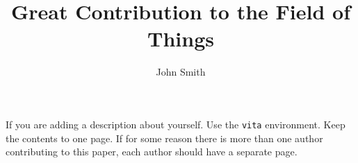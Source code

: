 \documentclass[]{../tex_resources/afitthesis}
\title{Great Contribution to the Field of Things}
\author{John Smith}
\begin{document}
\maketitle %







\appendix %




\nocite{*} %
\printbibliography %


\begin{vita} %
    If you are adding a description about yourself. Use the \verb|vita|
    environment. Keep the contents to one page. If for some reason there is
    more than one author contributing to this paper, each author should have a
    separate page.
\end{vita}


\sfTwoNineEight %
\end{document}

